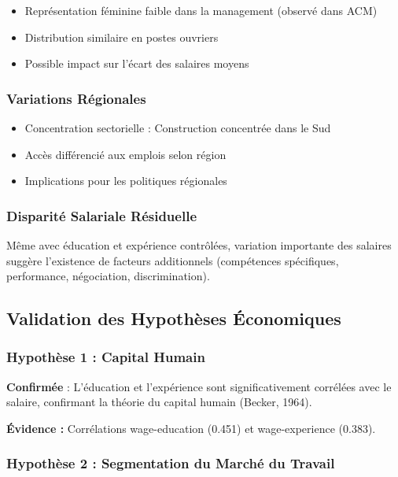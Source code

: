 \documentclass[12pt,a4paper]{report}
\begin{document}
\begin{itemize}
    \item Représentation féminine faible dans la management (observé dans ACM)
    \item Distribution similaire en postes ouvriers
    \item Possible impact sur l'écart des salaires moyens
\end{itemize}

\subsubsection{Variations Régionales}

\begin{itemize}
    \item Concentration sectorielle : Construction concentrée dans le Sud
    \item Accès différencié aux emplois selon région
    \item Implications pour les politiques régionales
\end{itemize}

\subsubsection{Disparité Salariale Résiduelle}

Même avec éducation et expérience contrôlées, variation importante des salaires suggère l'existence de facteurs additionnels (compétences spécifiques, performance, négociation, discrimination).

\subsection{Validation des Hypothèses Économiques}

\subsubsection{Hypothèse 1 : Capital Humain}

\textbf{Confirmée} : L'éducation et l'expérience sont significativement corrélées avec le salaire, confirmant la théorie du capital humain (Becker, 1964).

\textbf{Évidence :} Corrélations wage-education (0.451) et wage-experience (0.383).

\subsubsection{Hypothèse 2 : Segmentation du Marché du Travail}
\end{document}
